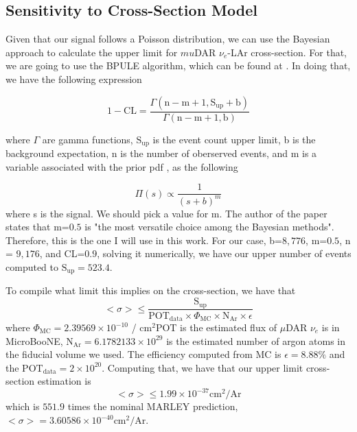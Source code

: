 \clearpage
\subsection{Sensitivity to Cross-Section Model}
Given that our signal follows a Poisson distribution, we can use the Bayesian approach to calculate the upper limit for $mu$DAR $\nu_e$-LAr cross-section. For that, we are going to use the BPULE algorithm, which can be found at \cite{BPULE}. 
In doing that, we have the following expression

\begin{equation}
    1-\textrm{CL} =\frac{\Gamma(\textrm{n}-\textrm{m}+1, \textrm{S}_{\textrm{up}}+\textrm{b})}{\Gamma(\textrm{n}-\textrm{m}+1,\textrm{b})}
\end{equation}

where $\Gamma$ are gamma functions, $\textrm{S}_{\textrm{up}}$ is the event count upper limit, b is 
the background expectation, n is the number of oberserved events, and m is a variable associated with the prior pdf , as the following

\begin{equation}
    \Pi(s) \propto \frac{1}{(s + b)^m}
\end{equation}
where s is the signal. We should pick a value for m. The author of the paper states that m=$0.5$ is "the most versatile choice among the Bayesian methods". Therefore, this is the one I will use in this work.  
For our case, b=$8,776$, m=$0.5$, n = $9,176$, and CL=$0.9$, solving it numerically, we have our upper number of events computed to $\textrm{S}_{\textrm{up}}=523.4$.

To compile what limit this implies on the cross-section, we have that
\begin{equation}
    <\sigma> \leq \frac{\textrm{S}_{\textrm{up}}}{\textrm{POT}_\textrm{data}\times\Phi_{\textrm{MC}}\times\textrm{N}_\textrm{Ar}\times \epsilon}
\end{equation}
where $\Phi_{\textrm{MC}} = 2.39569\times 10^{-10}$ / cm$^2$POT is the estimated flux of $\mu$DAR $\nu_e$ is in MicroBooNE, $\textrm{N}_\textrm{Ar} = 6.1782133\times 10^{29}$ is the estimated number of argon atoms in the fiducial volume we used. The efficiency computed from MC is $\epsilon=8.88\%$ and the $\textrm{POT}_\textrm{data} = 2\times 10^{20}$. Computing that, we have that our upper limit cross-section estimation is 
\begin{equation}
    <\sigma> \leq 1.99\times10^{-37} \textrm{cm}^2 / \textrm{Ar}
\end{equation}
which is $551.9$ times the nominal MARLEY prediction,  $<\sigma> = 3.60586\times 10^{-40} \textrm{cm}^2 / \textrm{Ar}$.